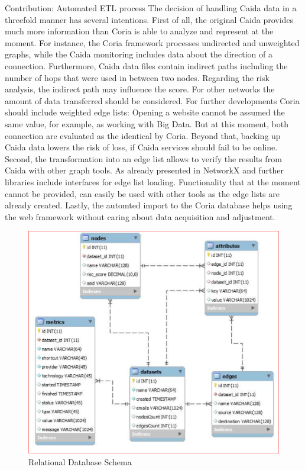 \documentclass[conference, 11pt]{IEEEtran}
\begin{document}
\begin{subsection}{Contribution: Automated ETL process}
The decision of handling Caida data in a threefold manner has several intentions. First of all, the original Caida provides much more information than Coria is able to analyze and represent at the moment. For instance, the Coria framework processes undirected and unweighted graphs, while the Caida monitoring includes data about the direction of a connection. Furthermore, Caida data files contain indirect paths including the number of hops that were used in between two nodes. Regarding the risk analysis, the indirect path may influence the score. For other networks the amount of data transferred should be considered. For further developments Coria should include weighted edge lists: Opening a website cannot be assumed the same value, for example, as working with Big Data. But at this moment, both connection are evaluated as the identical by Coria. Beyond that, backing up Caida data lowers the risk of loss, if Caida services should fail to be online.\\ \linebreak
Second, the transformation into an edge list allows to verify the results from Caida with other graph tools. As already presented in \cite{Coria3} NetworkX and further libraries include interfaces for edge list loading. Functionality that at the moment cannot be provided, can easily be used with other tools as the edge lists are already created.
Lastly, the automted import to the Coria database helps using the web framework without caring about data acquisition and adjustment. 


\vspace{0.5cm}
\begin{figure}[htbp]
\centerline{\includegraphics[scale=0.33]{Graphics/SQL_schema.PNG}}
\caption{Relational Database Schema}
\label{fig:SQL_schema}
\end{figure}
\vspace{0.5cm}

\end{subsection}
\end{document}
